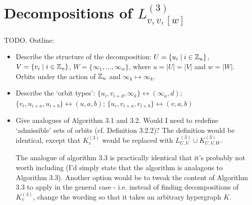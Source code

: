 \section{Decompositions of $L_{v,v,[w]}^{(3)}$}
\label{sec:methods/candelabra}

TODO. Outline:

\begin{itemize}
    \item Describe the structure of the decomposition: $U = \{u_i \mid i \in \mathbb{Z}_u\}$, $V = \{v_i \mid i \in \mathbb{Z}_u\}$, $W = \{\infty_1, \ldots, \infty_w\}$, where $u = |U| = |V|$ and $w = |W|$. Orbits under the action of $\mathbb{Z}_u$ and $\infty_k \mapsto \infty_k$.
    \item Describe the `orbit types': $\{u_i, v_{i+d}, \infty_k\} \leftrightarrow (\infty_a, d)$; $\{v_i, u_{i+a}, u_{i+b}\} \leftrightarrow (u, a, b)$; $\{u_i, v_{i+a}, v_{i+b}\} \leftrightarrow (v, a, b)$
    \item Give analogues of Algorithm 3.1 and 3.2. Would I need to redefine `admissible' sets of orbits (cf. Definition 3.2.2)? The definition would be identical, except that $K_{v}^{(3)}$ would be replaced with $L_{U,V}^{(3)} \cup K_{U,V,W}^{(3)}$.

    The analogue of algorithm 3.3 is practically identical that it's probably not worth including (I'd simply state that the algorithm is analagous to Algorithm 3.3). Another option would be to tweak the content of Algorithm 3.3 to apply in the general case - i.e. instead of finding decompositions of $K_{v}^{(3)}$, change the wording so that it takes an arbitrary hypergraph $K$.
\end{itemize}

